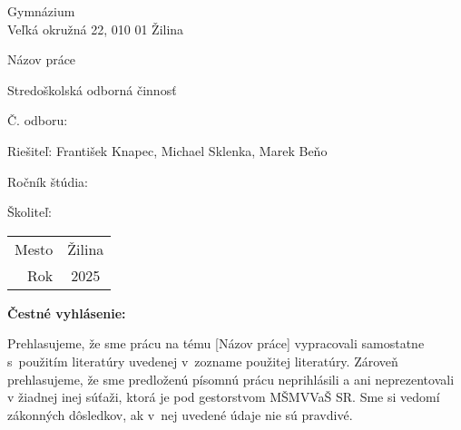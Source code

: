 \documentclass[12pt]{article}
\begin{document}
\begin{titlepage}
    \setlength{\parindent}{0pt}

    \begin{center}
        Gymnázium \\
        Veľká okružná 22, 010 01 Žilina

        \vspace{7cm}
        \Huge Názov práce

        \vspace{1.13cm}
        \Large Stredoškolská odborná činnosť

        \vspace{2.12cm}
        \normalsize Č. odboru:
    \end{center}

    \vfill

    \begin{minipage}{0.75\textwidth}
        Riešiteľ: František Knapec, Michael Sklenka, Marek Beňo \par
        Ročník štúdia: \par
        Školiteľ:
    \end{minipage}
    \hfill
    \begin{minipage}{0.2\textwidth}
        \hfil %
        \begin{tabular}{r@{: }c}
            Mesto & Žilina \\
            Rok   & 2025
        \end{tabular}
    \end{minipage}
\end{titlepage}


%
%
\noindent
\textbf{Čestné vyhlásenie:}

\noindent
Prehlasujeme, že sme prácu na tému
[Názov práce] %
vypracovali samostatne s~použitím literatúry uvedenej v~zozname použitej literatúry.
Zároveň prehlasujeme, že sme predloženú písomnú prácu neprihlásili a ani neprezentovali
v žiadnej inej súťaži, ktorá je pod gestorstvom MŠMVVaŠ SR. Sme si vedomí zákonných dôsledkov,
ak v~nej uvedené údaje nie sú pravdivé.

\newpage
\end{document}
